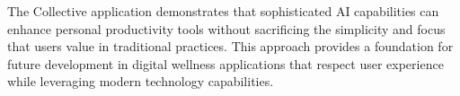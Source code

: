 \documentclass[conference]{IEEEtran}
\begin{document}
The Collective application demonstrates that sophisticated AI capabilities can enhance personal productivity tools without sacrificing the simplicity and focus that users value in traditional practices. This approach provides a foundation for future development in digital wellness applications that respect user experience while leveraging modern technology capabilities.


 






\end{document}
